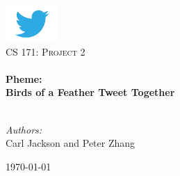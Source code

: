 \begin{titlepage}
\begin{center}

\includegraphics[width=0.15\textwidth]{twitterlogo.jpg}~\\[1cm]


\textsc{\Large CS 171: Project 2}\\[0.5cm]

\HRule \\[0.4cm]
{ \LARGE \bfseries Pheme: \\ Birds of a Feather Tweet Together} \\[0.4cm]

\HRule \\[1.5cm]

\begin{minipage}{0.6\textwidth}
\begin{flushleft} \large
\emph{Authors:}\\
Carl Jackson and Peter Zhang
\end{flushleft}
\end{minipage}
\begin{minipage}{0.4\textwidth}
\begin{flushright} \large
\end{flushright}
\end{minipage}

\vfill

{\large \today}

\end{center}
\end{titlepage}